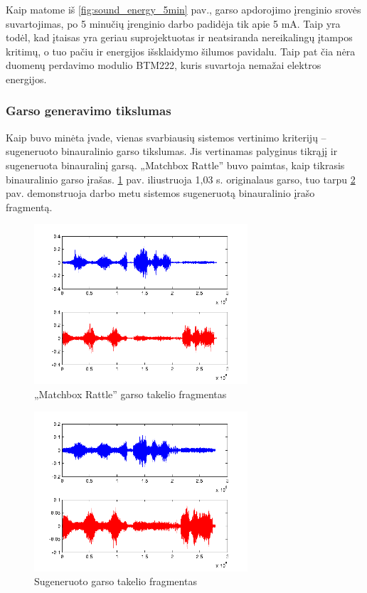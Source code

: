\documentclass[]{vgtuef}
\begin{document}
Kaip matome iš \ref{fig:sound_energy_5min} pav., garso apdorojimo įrenginio srovės suvartojimas, po 5 minučių įrenginio darbo padidėja tik apie 5 mA. Taip yra todėl, kad įtaisas yra geriau suprojektuotas ir neatsiranda nereikalingų įtampos kritimų, o tuo pačiu ir energijos išsklaidymo šilumos pavidalu. Taip pat čia nėra duomenų perdavimo modulio BTM222, kuris suvartoja nemažai elektros energijos.

\newpage

\subsubsection{Garso generavimo tikslumas}

Kaip buvo minėta įvade, vienas svarbiausių sistemos vertinimo kriterijų -- sugeneruoto binauralinio garso tikslumas. Jis vertinamas palyginus tikrąjį ir sugeneruota binauralinį garsą. „Matchbox Rattle'' buvo paimtas, kaip tikrasis binauralinio garso įrašas. \ref{fig:garsas_orig} pav. iliustruoja 1,03 s. originalaus garso, tuo tarpu \ref{fig:garsas_gen} pav. demonstruoja darbo metu sistemos sugeneruotą binauralinio įrašo fragmentą.

\begin{figure}[htbp]
  \centering
  \includegraphics[width=300px]{img/garsas_originalus.png}
  \caption{„Matchbox Rattle'' garso takelio fragmentas}
  \label{fig:garsas_orig}
\end{figure}

\begin{figure}[htbp]
  \centering
  \includegraphics[width=300px]{img/garsas_generuotas.png}
  \caption{Sugeneruoto garso takelio fragmentas}
  \label{fig:garsas_gen}
\end{figure}
\end{document}
